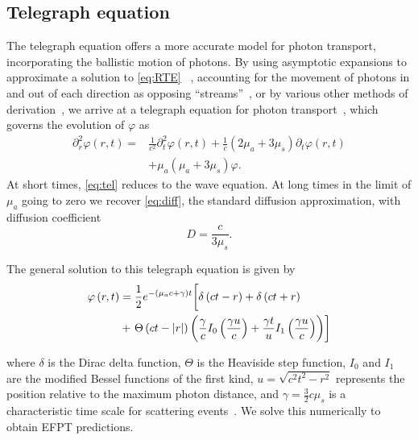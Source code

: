 \subsection{Telegraph equation}\label{subsec:teleg} 
The telegraph equation  offers a more accurate model for photon transport, incorporating the ballistic motion of photons. By using asymptotic expansions to approximate a solution to  \eqref{eq:RTE} ~\cite{heizler_asymptotic_2012, hoenders_telegraphers_2005, gombosi_telegraph_1993}, accounting for the movement of photons in and out of each direction as opposing ``streams''~\cite{schuster_radiation_1905,durian_two-stream_1996,lemieux_diffusing-light_1998,masoliver_solutions_1992}, or by various other methods of derivation~\cite{goldstein_diffusion_1951,dudko_photon_2005,masoliver_finite-velocity_1996,weiss_first_1984,weiss_applications_2002}, we arrive at a telegraph equation for photon transport~\cite{lemieux_diffusing-light_1998}, which governs the evolution of $\varphi$ as
\begin{align}
     \partial_{r}^{2} \varphi \left(r,t\right)  = &\frac{1}{c^{2}}\partial^{2}_{t} \varphi\left(r,t\right) + \frac{1}{c}\left(2 \mu_{a} + 3 \mu_{s} \right) \partial_{t} \varphi\left(r,t\right) \nonumber \\
    &+ \mu_{a}\left(\mu_{a} + 3 \mu_{s} \right) \varphi. \label{eq:tel}
\end{align}
At short times, \eqref{eq:tel} reduces to the wave equation. At long times in the limit of $\mu_{a}$ going to zero we recover \eqref{eq:diff}, the standard diffusion approximation, with diffusion coefficient~\cite{lemieux_diffusing-light_1998}
\begin{equation}\label{eq:telD}
    D = \frac{c}{3\mu_{s}}.
\end{equation}

The general solution to this telegraph equation is given by~\cite{goldstein_diffusion_1951,durian_photon_1997}
\begin{align}
    \varphi \left(r,t\right) &= \frac{1}{2} e^{-\left(\mu_{a}c + \gamma \right)t} \bigg[\delta \left(c t - r\right) + \delta\left(ct + r\right) \notag\\
    &+\left. \Theta\left(c t - |r|\right) \left(\frac{\gamma}{c}I_{0}\left(\frac{\gamma u}{c}\right) + \frac{\gamma t}{u}I_{1}\left(\frac{\gamma u}{c}\right)\right)\right]
\end{align}

where $\delta$ is the Dirac delta function, $\Theta$ is the Heaviside step function, $I_{0}$ and $I_{1}$ are the modified Bessel functions of the first kind, $u=\sqrt{c^{2}t^{2}-r^{2}}$ represents the position relative to the maximum photon distance, and $\gamma = \frac{3}{2} c \mu_{s}$ is a characteristic time scale for scattering events~\cite{goldstein_diffusion_1951,masoliver_solution_1993,masoliver_telegraphers_1994,masoliver_finite-velocity_1996}. We solve this numerically to obtain EFPT predictions.

